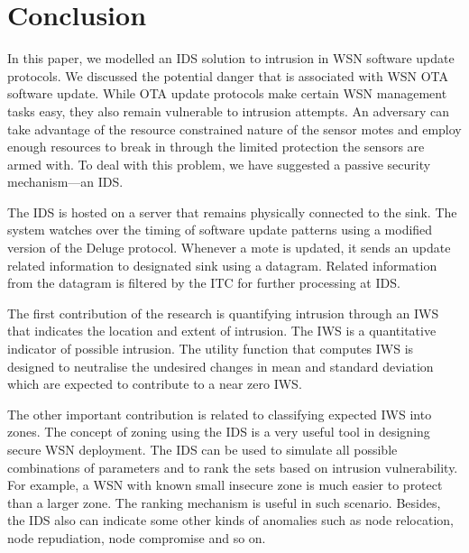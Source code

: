 \documentclass[conference]{IEEEtran}
\begin{document}
\section{Conclusion}
\label{sec:concl}

In this paper, we modelled an IDS solution to intrusion in WSN software update protocols.
We discussed the potential danger that is associated with WSN OTA software update.
While OTA update protocols make certain WSN management tasks easy, they also remain vulnerable to intrusion attempts.
An adversary can take advantage of the resource constrained nature of the sensor motes and employ enough resources to break in through the limited protection the sensors are armed with.
To deal with this problem, we have suggested a passive security mechanism---an IDS.

The IDS is hosted on a server that remains physically connected to the  sink. 
The system watches over the timing of software update patterns using a modified version of the Deluge protocol.
Whenever a mote is updated, it sends an update related information to designated sink using a datagram.  
Related information from the datagram is filtered by the ITC for further processing at IDS.

The first contribution of the research is quantifying intrusion through an IWS that indicates the location and extent of intrusion.
The IWS is a quantitative indicator of possible intrusion.
The utility function that computes IWS is designed to neutralise the undesired %
changes in mean and standard deviation which are expected to contribute to a near zero IWS.

The other important contribution is related to classifying expected IWS into zones.
The concept of zoning using the IDS is a very useful tool in designing secure WSN deployment.
The IDS can be used to simulate all possible combinations of parameters and  to rank the sets based on intrusion vulnerability.
For example, a WSN with known small insecure zone is much easier to protect than a larger zone.
The ranking mechanism is useful in such scenario.
Besides, the IDS also can indicate some other kinds of anomalies such as node relocation, node repudiation, node compromise and so on.
\end{document}
